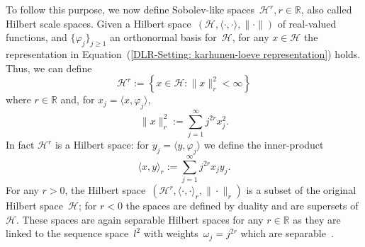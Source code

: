 To follow this purpose, we now define Sobolev-like spaces~$\mathcal{H}^r , r \in \mathbb{R}$, also called Hilbert scale spaces. Given a Hilbert space~$ (\mathcal{H}, \langle \cdot, \cdot \rangle, \| \cdot \|) $ of real-valued functions, and  $\{ \varphi_j \}_{j \geq 1}$ an orthonormal basis for~$\mathcal{H}$, for any $x \in \mathcal{H}$ the representation in Equation~(\ref{DLR-Setting: karhunen-loeve representation}) holds. Thus, we can define
\begin{equation}
 \mathcal{H}^r := \left\{ x \in \mathcal{H}: \| x \|_r^2 < \infty \right\}
\end{equation}
where $r \in \mathbb{R}$ and, for $ x_j = \langle x, \varphi_j \rangle $,
\begin{equation}
\label{DLR-Setting: H^r norm}
 \| x \|_r^2 := \sum_{j=1}^{\infty} j^{2r} x_j^2.
\end{equation}
In fact $\mathcal{H}^r$ is a Hilbert space: for $ y_j = \langle y, \varphi_j \rangle $ we define the inner-product
\begin{equation}
 \langle x, y \rangle_{r} := \sum_{j=1}^{\infty} j^{2r} x_j y_j.
\end{equation}
For any $r>0$, the Hilbert space~$ (\mathcal{H}^r, \langle \cdot, \cdot \rangle_r, \| \cdot \|_r) $ is a subset of the original Hilbert space~$\mathcal{H}$; for $r<0$ the spaces are defined by duality and are supersets of $\mathcal{H}$. These spaces are again separable Hilbert spaces for any $r \in \mathbb{R}$ as they are linked to the sequence space~$l^2$ with weights~$\omega_j = j^{2r}$ which are separable~\autocite[Section 6.1.3]{Dashti2014}.

